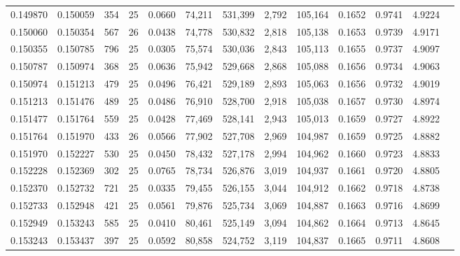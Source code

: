 \begin{tabular}{rrrrrrrrrrrrr}
0.149870 & 0.150059 &   354 &  25 &                                     0.0660 &  74,211 & 531,399 &   2,792 & 105,164 & 0.1652 & 0.9741 & 4.9224 \\
0.150060 & 0.150354 &   567 &  26 &                                     0.0438 &  74,778 & 530,832 &   2,818 & 105,138 & 0.1653 & 0.9739 & 4.9171 \\
0.150355 & 0.150785 &   796 &  25 &                                     0.0305 &  75,574 & 530,036 &   2,843 & 105,113 & 0.1655 & 0.9737 & 4.9097 \\
0.150787 & 0.150974 &   368 &  25 &                                     0.0636 &  75,942 & 529,668 &   2,868 & 105,088 & 0.1656 & 0.9734 & 4.9063 \\
0.150974 & 0.151213 &   479 &  25 &                                     0.0496 &  76,421 & 529,189 &   2,893 & 105,063 & 0.1656 & 0.9732 & 4.9019 \\
0.151213 & 0.151476 &   489 &  25 &                                     0.0486 &  76,910 & 528,700 &   2,918 & 105,038 & 0.1657 & 0.9730 & 4.8974 \\
0.151477 & 0.151764 &   559 &  25 &                                     0.0428 &  77,469 & 528,141 &   2,943 & 105,013 & 0.1659 & 0.9727 & 4.8922 \\
0.151764 & 0.151970 &   433 &  26 &                                     0.0566 &  77,902 & 527,708 &   2,969 & 104,987 & 0.1659 & 0.9725 & 4.8882 \\
0.151970 & 0.152227 &   530 &  25 &                                     0.0450 &  78,432 & 527,178 &   2,994 & 104,962 & 0.1660 & 0.9723 & 4.8833 \\
0.152228 & 0.152369 &   302 &  25 &                                     0.0765 &  78,734 & 526,876 &   3,019 & 104,937 & 0.1661 & 0.9720 & 4.8805 \\
0.152370 & 0.152732 &   721 &  25 &                                     0.0335 &  79,455 & 526,155 &   3,044 & 104,912 & 0.1662 & 0.9718 & 4.8738 \\
0.152733 & 0.152948 &   421 &  25 &                                     0.0561 &  79,876 & 525,734 &   3,069 & 104,887 & 0.1663 & 0.9716 & 4.8699 \\
0.152949 & 0.153243 &   585 &  25 &                                     0.0410 &  80,461 & 525,149 &   3,094 & 104,862 & 0.1664 & 0.9713 & 4.8645 \\
0.153243 & 0.153437 &   397 &  25 &                                     0.0592 &  80,858 & 524,752 &   3,119 & 104,837 & 0.1665 & 0.9711 & 4.8608 \\

\end{tabular}
